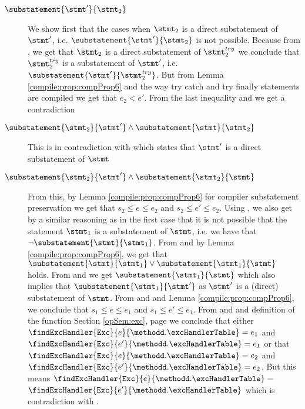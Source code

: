 \begin{description}
  \item[$ \substatement{\stmt'}{\stmt_2}  $] 
       We show first that the cases when $\stmt_2$ is a direct substatement of $\stmt'$, i.e.  $\substatement{\stmt'}{\stmt_2}$ is not possible. 
       Because from , we get that  $ \stmt_2$ is a direct substatement of $\stmt^{try}_2$ we conclude that
       $\stmt^{try}_2 $ is a substatement of $\stmt'$, i.e.    $\substatement{\stmt'}{ \stmt^{try}_2  }$.
       But from Lemma \ref{compile:prop:compProp6} and the way try catch  and try finally statements are compiled
       we get that $e_2 <  e'$. From the last inequality and  we get  a contradiction
       
  \item[$\substatement{\stmt_2} {\stmt'} \wedge \substatement{\stmt}{\stmt_2}    $] 
       This is in contradiction with   which states that $\stmt'$ is a direct substatement 
       of  $\stmt$

  \item[$ \substatement{\stmt_2} {\stmt'} \wedge \substatement{\stmt_2}{\stmt}  $] 
       From this, by Lemma \ref{compile:prop:compProp6} for compiler substatement preservation  we get that
           $s_2 \le e \le e_2$ and $s_2 \le e' \le e_2 $.
       Using , we also get by a similar reasoning as in the first case that 
       it is not possible that the statement $\stmt_1$ is a substatement of $\stmt$, i.e. we have that
        $\neg \substatement{\stmt}{\stmt_1}$. From  and  by Lemma 
       \ref{compile:prop:compProp6}, we get that    $ \substatement{\stmt}{\stmt_1} \vee \substatement{\stmt_1}{\stmt} $ holds.
       From   and   we get   $ \substatement{\stmt_1}{\stmt}$ which also implies that 
        $ \substatement{\stmt_1}{\stmt'}$ as $\stmt'$ is a (direct) substatement of $\stmt$. 
       From    and  and  Lemma \ref{compile:prop:compProp6}, we conclude that   
           $s_1 \le e \le e_1$ and $s_1 \le e' \le e_1$. From   and  and 
       definition of the function \findExcHandlerOnly{}  Section \ref{opSem:exc}, page \pageref{opSem:exc} we conclude that either
       $\findExcHandler{\mbox{\rm\tt{Exc}} }{e}{\methodd.\excHandlerTable} =  e_1 $ and 
        $\findExcHandler{\mbox{\rm\tt{Exc}} }{e'}{\methodd.\excHandlerTable} =  e_1 $
	or that \\
         $\findExcHandler{\mbox{\rm\tt{Exc}} }{e}{\methodd.\excHandlerTable} =  e_2 $ and 
        $\findExcHandler{\mbox{\rm\tt{Exc}} }{e'}{\methodd.\excHandlerTable} =  e_2 $. But this means 
	 $\findExcHandler{\mbox{\rm\tt{Exc}} }{e}{\methodd.\excHandlerTable} = $\\
	  $\findExcHandler{\mbox{\rm\tt{Exc}} }{e'}{\methodd.\excHandlerTable}$
	 which is contradiction with .
	
 
      
\end{description}



